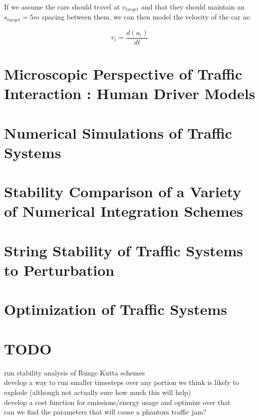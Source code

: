 \documentclass[11pt]{article}
\begin{document}
If we assume the cars should travel at $v_{target}$ and that they should maintain an $s_{target} = 5m$ spacing between them, we can then model the velocity of the car as:

\begin{equation}\label{eq:velocity}
v_{i} = \frac{d(a_i)}{dt}
\end{equation}

\section{Microscopic Perspective of Traffic Interaction : Human Driver Models}

\section{Numerical Simulations of Traffic Systems}

\section{Stability Comparison of a Variety of Numerical Integration Schemes}

\section{String Stability of Traffic Systems to Perturbation}

\section{Optimization of Traffic Systems}

\section{TODO}
run stability analysis of Runge Kutta schemes \\
develop a way to run smaller timesteps over any portion we think is likely to explode (although not actually sure how much this will help) \\
develop a cost function for emissions/energy usage and optimize over that \\
can we find the parameters that will cause a phantom traffic jam?
\end{document}
